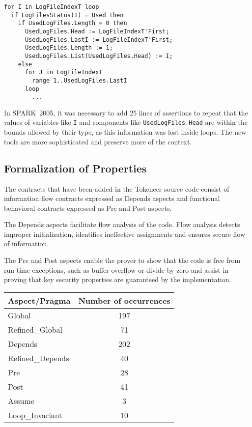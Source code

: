 \documentclass[10pt,a4paper,twocolumn]{article}
\newcommand{\oldspark}{SPARK~2005\xspace}
\newcommand{\SPARK}[1]{\lstinline[language=Ada,basicstyle={\footnotesize
      \sffamily},framesep=0pt]$#1$}
\begin{document}
\begin{lstlisting}
for I in LogFileIndexT loop
  if LogFilesStatus(I) = Used then
    if UsedLogFiles.Length = 0 then
      UsedLogFiles.Head := LogFileIndexT'First;
      UsedLogFiles.LastI := LogFileIndexT'First;
      UsedLogFiles.Length := 1;
      UsedLogFiles.List(UsedLogFiles.Head) := I;
    else
      for J in LogFileIndexT
        range 1..UsedLogFiles.LastI
      loop
        ...
\end{lstlisting}

In \oldspark, it was necessary to add 25 lines of assertions to repeat that the
values of variables like \SPARK{I} and components like
\SPARK{UsedLogFiles.Head} are within the bounds allowed by their type, as this
information was lost inside loops. The new tools are more sophisticated and
preserve more of the context.


\subsection{Formalization of Properties}

The contracts that have been added in the Tokeneer source code consist
of information flow contracts expressed as Depends aspects and
functional behavioral contracts expressed as Pre and Post aspects.

The Depends aspects facilitate flow analysis of the code. Flow
analysis detects improper initialization, identifies ineffective
assignments and ensures secure flow of information.

The Pre and Post aspects enable the prover to show that the code is
free from run-time exceptions, such as buffer overflow or
divide-by-zero and assist in proving that key security properties are
guaranteed by the implementation.

\begin{tabular}{|l|c|}
\hline
Aspect/Pragma       & Number of occurrences  \\
\hline
\hline
Global              & 197 \\
\hline
Refined\_Global     & 71 \\
\hline
Depends             & 202 \\
\hline
Refined\_Depends    & 40 \\
\hline
Pre                 & 28 \\
\hline
Post                & 41 \\
\hline
Assume              & 3 \\
\hline
Loop\_Invariant     & 10 \\
\hline
\end{tabular}
\end{document}
